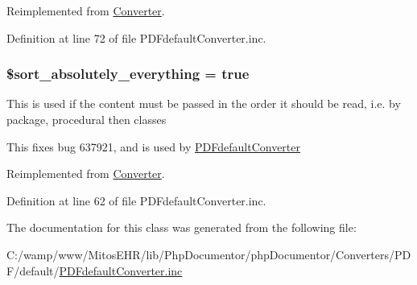 \-Reimplemented from \hyperlink{class_converter_afc2adf23943f2cf6a93997e5ab9bca62}{\-Converter}.



\-Definition at line 72 of file \-P\-D\-Fdefault\-Converter.\-inc.

\hypertarget{class_p_d_fdefault_converter_a40eea215f3b8eaec5c134f45f62aa100}{
\subsubsection[{\$sort\-\_\-absolutely\-\_\-everything}]{\setlength{\rightskip}{0pt plus 5cm}\$sort\-\_\-absolutely\-\_\-everything = true}}\label{class_p_d_fdefault_converter_a40eea215f3b8eaec5c134f45f62aa100}
\-This is used if the content must be passed in the order it should be read, i.\-e. by package, procedural then classes

\-This fixes bug 637921, and is used by \hyperlink{class_p_d_fdefault_converter}{\-P\-D\-Fdefault\-Converter} 

\-Reimplemented from \hyperlink{class_converter_a40eea215f3b8eaec5c134f45f62aa100}{\-Converter}.



\-Definition at line 62 of file \-P\-D\-Fdefault\-Converter.\-inc.



\-The documentation for this class was generated from the following file\-:\begin{DoxyCompactItemize}
\item 
\-C\-:/wamp/www/\-Mitos\-E\-H\-R/lib/\-Php\-Documentor/php\-Documentor/\-Converters/\-P\-D\-F/default/\hyperlink{_p_d_fdefault_converter_8inc}{\-P\-D\-Fdefault\-Converter.\-inc}\end{DoxyCompactItemize}

